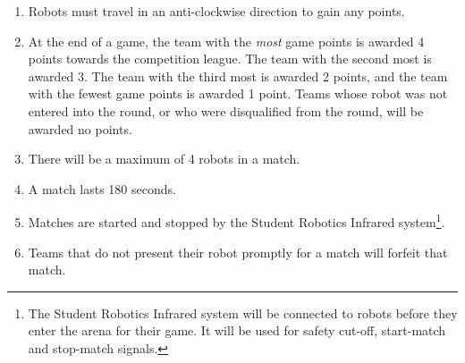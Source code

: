 \begin{enumerate}
\item Robots must travel in an anti-clockwise direction to gain any points.

\item At the end of a game, the team with the \emph{most} game points is awarded 4 points towards the competition league.
 The team with the second most is awarded 3.
 The team with the third most is awarded 2 points, and the team with the fewest game points is awarded 1 point.
 Teams whose robot was not entered into the round, or who were disqualified from the round, will be awarded no points.

\item There will be a maximum of 4 robots in a match.
\item A match lasts 180 seconds.
\item Matches are started and stopped by the Student Robotics Infrared system\footnote{The Student Robotics Infrared system will be connected to robots before they enter the arena for their game.  It will be used for safety cut-off, start-match and stop-match signals.}.
\item Teams that do not present their robot promptly for a match will forfeit that match.
\end{enumerate}
